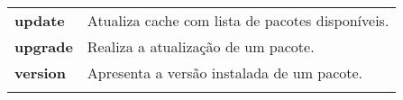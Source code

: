\begin{longtable}{lm{11cm}}
	\textbf{\code update} & Atualiza cache com lista de pacotes disponíveis. \\ %
	\rowcolor[gray]{0.8}
	\textbf{\code upgrade} & Realiza a atualização de um pacote. \\ %
	\textbf{\code version} & Apresenta a versão instalada de um pacote. \\ %
\bottomrule
\label{sync_gerenciadores}
\end{longtable}


